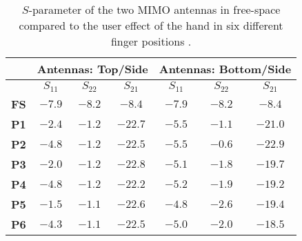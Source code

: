 \begin{table}[htbp]
  \centering
  \begin{tabular}{|c|c|c|c|c|c|c|}
    \hline
    & \multicolumn{3}{c|}{\textbf{Antennas: Top/Side}} & \multicolumn{3}{c|}{\textbf{Antennas: Bottom/Side}} \\ \hline
                  & $S_{11}$ & $S_{22}$ & $S_{21}$ & $S_{11}$ & $S_{22}$ & $S_{21}$             \\ \hline
    \textbf{FS}   & $-7.9$   & $-8.2$   & $-8.4 $  & $-7.9$   & $-8.2$   & $-8.4 $           \\ \hline
    \textbf{P1}   & $-2.4$   & $-1.2$   & $-22.7$  & $-5.5$   & $-1.1$   & $-21.0$           \\ \hline
    \textbf{P2}   & $-4.8$   & $-1.2$   & $-22.5$  & $-5.5$   & $-0.6$   & $-22.9$           \\ \hline
    \textbf{P3}   & $-2.0$   & $-1.2$   & $-22.8$  & $-5.1$   & $-1.8$   & $-19.7$           \\ \hline
    \textbf{P4}   & $-4.8$   & $-1.2$   & $-22.2$  & $-5.2$   & $-1.9$   & $-19.2$           \\ \hline
    \textbf{P5}   & $-1.5$   & $-1.1$   & $-22.6$  & $-4.8$   & $-2.6$   & $-19.4$           \\ \hline
    \textbf{P6}   & $-4.3$   & $-1.1$   & $-22.5$  & $-5.0$   & $-2.0$   & $-18.5$           \\ \hline
  \end{tabular}
  \caption{$S$-parameter of the two MIMO antennas in free-space compared to the user effect of the hand in six different finger positions \cite{Samantha2014UserEff}.}
  \label{tab:usereff_s11}
\end{table}

